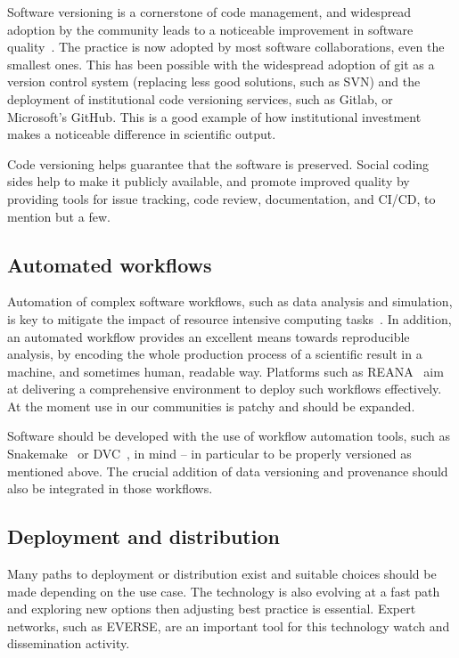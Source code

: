 Software versioning is a cornerstone of code management, and widespread adoption by the community leads to a noticeable improvement in software quality~\cite{swebok4}. The practice is now adopted by most software collaborations, even the smallest ones. This has been possible with the widespread adoption of git as a version control system (replacing less good solutions, such as SVN) and the deployment of institutional code versioning services, such as Gitlab, or Microsoft's GitHub. This is a good example of how institutional investment makes a noticeable difference in scientific output.

Code versioning helps guarantee that the software is preserved. Social coding sides help to make it publicly available, and promote improved quality by providing tools for issue tracking, code review, documentation, and CI/CD, to mention but a few. 


\subsection{Automated workflows}

Automation of complex software workflows, such as data analysis and simulation, is key to mitigate the impact of resource intensive computing tasks~\cite{swebok4}. In addition, an automated workflow provides an excellent means towards reproducible analysis, by encoding the whole production process of a scientific result in a machine, and sometimes human, readable way. Platforms such as REANA~\cite{REANA} aim at delivering a comprehensive environment to deploy such workflows effectively. At the moment use in our communities is patchy and should be expanded.

Software should be developed with the use of workflow automation tools, such as Snakemake~\cite{snakemake} or DVC~\cite{The_DVC_team_and_contributors_DVC_Data_Version}, in mind -- in particular to be properly versioned as mentioned above. The crucial addition of data versioning and provenance should also be integrated in those workflows. 

\subsection{Deployment and distribution}

Many paths to deployment or distribution exist and suitable choices should be made depending on the use case. The technology is also evolving at a fast path and exploring new options then adjusting best practice is essential. Expert networks, such as EVERSE, are an important tool for this technology watch and dissemination activity. 

